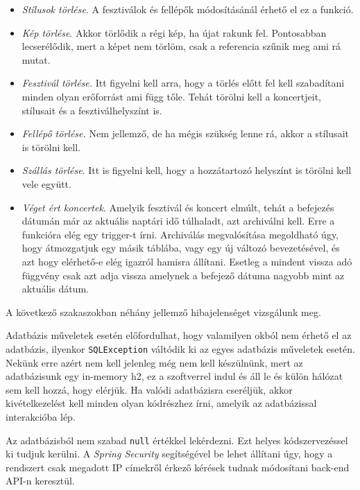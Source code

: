 \begin{itemize}
\item \textit{Stílusok törlése}. A fesztiválok és fellépők módosításánál érhető el ez a funkció.

\item \textit{Kép törlése}. Akkor törlődik a régi kép, ha újat rakunk fel. Pontosabban lecserélődik, mert a képet nem törlöm, csak a referencia szűnik meg ami rá mutat.

\item \textit{Fesztivál törlése.} Itt figyelni kell arra, hogy a törlés előtt fel kell szabadítani minden olyan erőforrást ami függ tőle. Tehát törölni kell a koncertjeit, stílusait és a fesztiválhelyszínt is.
\item \textit{Fellépő törlése.} Nem jellemző, de ha mégis szükség lenne rá, akkor a stílusait is törölni kell.
\item \textit{Szállás törlése}. Itt is figyelni kell, hogy a hozzátartozó helyszínt is törölni kell vele együtt.
\item \textit{Véget ért koncertek}. Amelyik fesztivál és koncert elmúlt, tehát a befejezés dátumán már az aktuális naptári idő  túlhaladt, azt archiválni kell. Erre a funkcióra elég egy trigger-t írni. Archiválás megvalósítása megoldható úgy, hogy átmozgatjuk egy másik táblába, vagy egy új változó bevezetésével, és azt hogy elérhető-e elég igazról hamisra állítani. Esetleg a mindent vissza adó függvény csak azt adja vissza amelynek a befejező dátuma nagyobb mint az aktuális dátum.
\end{itemize}


A következő szakaszokban néhány jellemző hibajelenséget vizsgálunk meg.


Adatbázis műveletek esetén előfordulhat, hogy valamilyen okból nem érhető el az adatbázis, ilyenkor \texttt{SQLException} váltódik ki az egyes adatbázis műveletek esetén. Nekünk erre azért nem kell jelenleg még nem kell készülnünk, mert az adatbázisunk egy in-memory h2, ez a szoftverrel indul és áll le és külön hálózat sem kell hozzá, hogy elérjük. Ha valódi adatbázisra cseréljük, akkor kivételkezelést kell minden olyan kódrészhez írni, amelyik az adatbázissal interakcióba lép.


Az adatbázisból nem szabad \texttt{null} értékkel lekérdezni. Ezt helyes kódszervezéssel ki tudjuk kerülni. A \textit{Spring Security} segítségével be lehet állítani úgy, hogy a rendszert csak megadott IP címekről érkező kérések tudnak módosítani back-end API-n keresztül.

